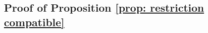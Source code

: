 \documentclass{article}
\theoremstyle{plain}%
\newtheorem{lem}[thm]{Lemma}
\theoremstyle{definition}
\numberwithin{equation}{section}
\numberwithin{figure}{section}
\def\e#1\e{\begin{equation}#1\end{equation}}
\def\eq{\eqref}
\def\l{\label}
\def\fm{{\mathfrak m}}
\def\cF{{\mathbin{\cal F}}}
\def\cW{{\mathbin{\cal W}}}
\def\iy{\infty}
\begin{document}

 



\subsection{Proof of Proposition \ref{prop: restriction compatible}}
\label{sec:proof-proposition}
\end{document}
